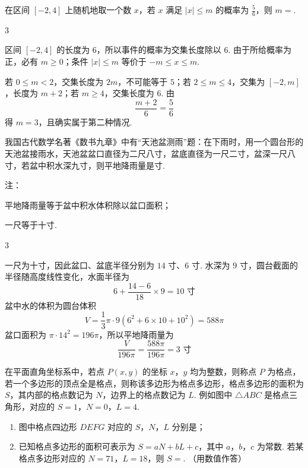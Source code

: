 \begin{problem}
在区间 \([-2, 4]\) 上随机地取一个数 \(x\)，若 \(x\) 满足 \(|x| \leqslant m\) 的概率为 \(\frac{5}{6}\)，则 \(m = \)\fillinblank{}.
\end{problem}

\begin{answer}
3
\end{answer}

\begin{solution}
区间 \([-2,4]\) 的长度为 \(6\)，所以事件的概率为交集长度除以 \(6\). 由于所给概率为正，必有 \(m\geqslant0\)；条件 \(|x|\leqslant m\) 等价于 \(-m\leqslant x\leqslant m\).

若 \(0\leqslant m<2\)，交集长度为 \(2m\)，不可能等于 \(5\)；若 \(2\leqslant m\leqslant4\)，交集为 \([-2,m]\)，长度为 \(m+2\)；若 \(m\geqslant4\)，交集长度为 \(6\). 由
\[
 \frac{m+2}{6}=\frac56
\]
得 \(m=3\)，且确实属于第二种情况.
\end{solution}

\begin{problem}
我国古代数学名著《数书九章》中有“天池盆测雨”题：在下雨时，用一个圆台形的天池盆接雨水，天池盆盆口直径为二尺八寸，盆底直径为一尺二寸，盆深一尺八寸，若盆中积水深九寸，则平地降雨量是\fillinblank{}\(\text{寸}\).

注：
\begin{circlelist}
\item 平地降雨量等于盆中积水体积除以盆口面积；
\item 一尺等于十寸.
\end{circlelist}
\end{problem}

\begin{answer}
3
\end{answer}

\begin{solution}
一尺为十寸，因此盆口、盆底半径分别为 \(14\) 寸、\(6\) 寸. 水深为 \(9\) 寸，圆台截面的半径随高度线性变化，水面半径为
\[
 6+\frac{14-6}{18}\times9=10\text{ 寸}
\]
盆中水的体积为圆台体积
\[
 V=\frac{1}{3}\pi\cdot9\left(6^2+6\times10+10^2\right)=588\pi
\]
盆口面积为 \(\pi\cdot14^2=196\pi\)，所以平地降雨量为
\[
 \frac{V}{196\pi}=\frac{588\pi}{196\pi}=3\text{ 寸}
\]
\end{solution}

\begin{problem}
在平面直角坐标系中，若点 \(P(x,y)\) 的坐标 \(x\)，\(y\) 均为整数，则称点 \(P\) 为格点，若一个多边形的顶点全是格点，则称该多边形为格点多边形，格点多边形的面积为 \(S\)，其内部的格点数记为 \(N\)，边界上的格点数记为 \(L\). 例如图中 \(\triangle ABC\) 是格点三角形，对应的 \(S=1\)，\(N=0\)，\(L=4\).

\begin{enumerate}
\item 图中格点四边形 \(DEFG\) 对应的 \(S\)，\(N\)，\(L\) 分别是\fillinblank{}；
\item 已知格点多边形的面积可表示为 \(S=aN+bL+c\)，其中 \(a\)，\(b\)，\(c\) 为常数. 若某格点多边形对应的 \(N=71\)，\(L=18\)，则 \(S=\)\fillinblank{}. （用数值作答）
\end{enumerate}

\end{problem}

